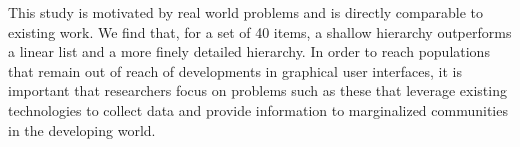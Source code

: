 \documentclass{sigchi}
\begin{document}
This study is motivated by real world problems and is directly comparable to existing work. We find that, for a set of 40 items, a shallow hierarchy outperforms a linear list and a more finely detailed hierarchy. In order to reach populations that remain out of reach of developments in graphical user interfaces, it is important that researchers focus on problems such as these that leverage existing technologies to collect data and provide information to marginalized communities in the developing world. 

%
%
%
%
%
\balance



\end{document}

